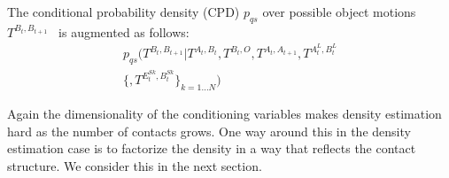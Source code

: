 The conditional probability density (CPD) $p_{qs}$ over possible object motions $T^{B_{t}, B_{t+1}}$~\citep{kopicki_prediction_2009} is augmented as follows:
\begin{multline}
p_{qs}(T^{B_{t}, B_{t+1}} | T^{A_t, B_t}, T^{B_t, O}, T^{A_{t}, A_{t+1}}, T^{A^{L}_t, B^{L}_t} \\ \{, T^{E^{Sk}_t,B^{Sk}_t}\}_{k=1 \ldots N})
\label{eq:Learning.density}
\end{multline}

Again the dimensionality of the conditioning variables makes density estimation hard as the number of contacts grows. One way around this in the density estimation case is to factorize the density in a way that reflects the contact structure. We consider this in the next section. 